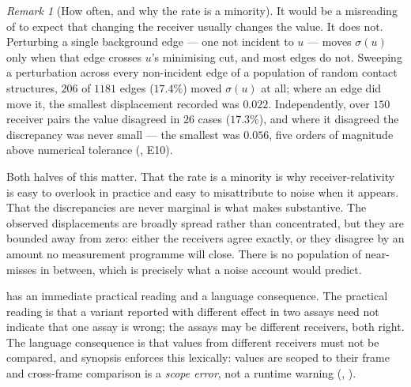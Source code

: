 \documentclass[11pt,twocolumn,a4paper]{article}
\theoremstyle{plain}
\theoremstyle{definition}
\theoremstyle{remark}
\newtheorem{remark}[theorem]{Remark}
\newcommand{\sep}{\sigma}                      %
\begin{document}
\begin{remark}[How often, and why the rate is a minority]
\label{rem:receiverrate}
It would be a misreading of  to expect that changing
the receiver usually changes the value. It does not. Perturbing a single
background edge --- one not incident to $u$ --- moves $\sep(u)$ only when
that edge crosses $u$'s minimising cut, and most edges do not. Sweeping
a perturbation across every non-incident edge of a population of random
contact structures, $206$ of $1181$ edges ($17.4\%$) moved $\sep(u)$ at
all; where an edge did move it, the smallest displacement recorded was
$0.022$. Independently, over $150$ receiver pairs the value disagreed in
$26$ cases ($17.3\%$), and where it disagreed the discrepancy was never
small --- the smallest was $0.056$, five orders of magnitude above
numerical tolerance (, E10).

Both halves of this matter. That the rate is a minority is why
receiver-relativity is easy to overlook in practice and easy to
misattribute to noise when it appears. That the discrepancies are never
marginal is what makes  substantive. The observed
displacements are broadly spread rather than concentrated, but they are
bounded away from zero: either the receivers agree exactly, or they
disagree by an amount no measurement programme will close. There is no
population of near-misses in between, which is precisely what a noise
account would predict.
\end{remark}

 has an immediate practical reading and a language
consequence. The practical reading is that a variant reported with
different effect in two assays need not indicate that one assay is
wrong; the assays may be different receivers, both right. The language
consequence is that values from different receivers must not be
compared, and synopsis enforces this lexically: values are scoped to
their frame and cross-frame comparison is a \emph{scope error}, not a
runtime warning (, ).
\end{document}
